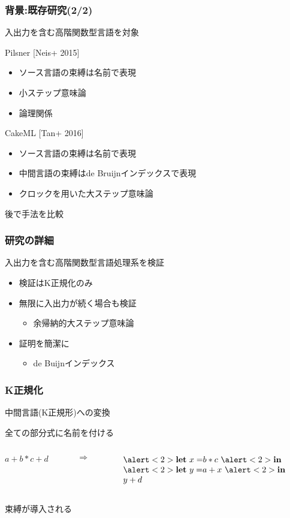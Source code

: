 \documentclass[dvipdfmx,cjk,xcolor=dvipsnames,envcountsect,notheorems,12pt]{beamer}
\theoremstyle{definition}
\newcommand{\keyword}[1]{\mathbf{#1}}
\newcommand{\LET}{\keyword{let}}
\newcommand{\IN}{\keyword{in}}
\begin{document}
\begin{frame}
	\frametitle{背景:既存研究(2/2)}
	\Large
	入出力を含む高階関数型言語を対象

	\vfill

	Pilsner [Neis+ 2015]
	\begin{itemize}
		\item ソース言語の束縛は名前で表現
		\item 小ステップ意味論
		\item 論理関係
	\end{itemize}

	CakeML [Tan+ 2016]
	\begin{itemize}
		\item ソース言語の束縛は名前で表現
		\item 中間言語の束縛はde Bruijnインデックスで表現
		\item クロックを用いた大ステップ意味論
	\end{itemize}
	後で手法を比較
\end{frame}

\begin{frame}
	\frametitle{研究の詳細}
	\Large 入出力を含む高階関数型言語処理系を検証
	\begin{itemize}
		\item 検証はK正規化のみ
		\item 無限に入出力が続く場合も検証
			\begin{itemize}
				\item 余帰納的大ステップ意味論
			\end{itemize}
		\item 証明を簡潔に
			\begin{itemize}
				\item de Buijnインデックス
			\end{itemize}
	\end{itemize}
\end{frame}

\begin{frame}
	\frametitle{K正規化}
	\LARGE
	中間言語(K正規形)への変換

	全ての部分式に名前を付ける

	\vfill

	\begin{columns}
		\begin{column}{0.3\textwidth}
			$a+b*c+d$
		\end{column}
		\begin{column}{0.1\textwidth}
			$\Rightarrow$
		\end{column}
		\begin{column}{0.5\textwidth}
			$\begin{array}{l}
				\alert<2>{\LET~x =} b * c~\alert<2>{\IN} \\
				\alert<2>{\LET~y =} a + x~\alert<2>{\IN} \\
				y + d
			\end{array}$
		\end{column}
	\end{columns}

	\vfill

	\alert<2>{束縛が導入される}
	\pause
\end{frame}
\end{document}
